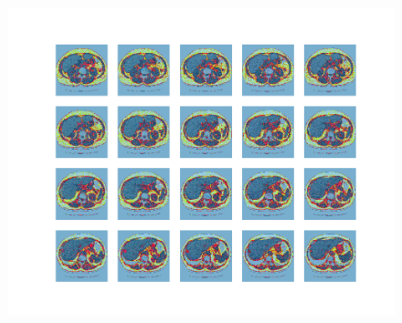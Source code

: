 \documentclass[conference,11pt]{IEEEtran}
\begin{document}
\begin{figure}
    \centering
         \includegraphics[width=0.8\linewidth]{figures/plot_slices.png}
      \label{fig:slices}
\end{figure}




\end{document}
